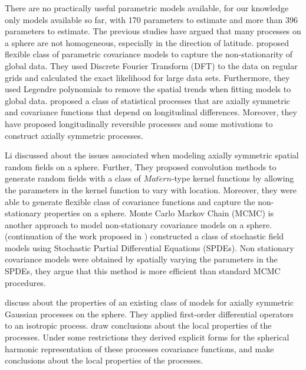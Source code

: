 
There are no practically useful parametric models available, for our knowledge only models available so far, \cite{stein1999} with 170 parameters to estimate and \cite{CressieJohannesson2008} more than 396 parameters to estimate. The previous studies have argued that many processes on a sphere are not homogeneous, especially in the direction of latitude. \cite{JunStein2008} proposed flexible class of parametric covariance models to capture the non-stationarity of global data. They used Discrete Fourier Transform (DFT) to the data on regular grids and calculated the exact likelihood for large data sets. Furthermore, they used Legendre polynomials to remove the spatial trends when fitting models to global data.  
\cite{Huang2012} proposed a class of statistical processes that are axially symmetric and covariance functions that depend on longitudinal differences. Moreover, they have proposed longitudinally reversible processes and some motivations to construct axially symmetric processes.

Li \cite{Li2013} discussed about the issues associated when modeling axially symmetric spatial random fields on a sphere. Further, They proposed convolution methods to generate random fields with a class of $Mat\acute{e}rn$-type kernel functions by allowing the parameters in the kernel function to vary with location. Moreover, they were able to generate flexible class of covariance functions and capture the non-stationary properties on a sphere. Monte Carlo Markov Chain (MCMC) is another approach to model non-stationary covariance models on a sphere. \cite{BolinLindgren2011} (continuation of the work proposed in \cite{Lindgren2011} ) constructed a class of stochastic field models using Stochastic Partial Differential Equations (SPDEs). Non stationary covariance models were obtained by spatially varying the parameters in the SPDEs, they argue that this method is more efficient than standard MCMC procedures. 

\cite{HitczenkoStein2012} discuss about the properties of an existing class of models for axially symmetric Gaussian processes on the sphere. They applied first-order differential operators to an isotropic process. draw conclusions about the local properties of the processes. Under some restrictions they derived explicit forms for the spherical harmonic representation of these processes covariance functions, and make conclusions about the local properties of the processes.

